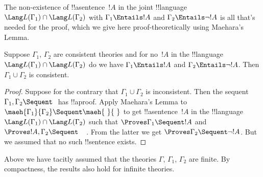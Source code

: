 \documentclass[../../../include/open-logic-section]{subfiles}
\begin{document}
The non-existence of !!a{sentence}~$!A$ in the joint
!!{language}~$\Lang L(\Gamma_1) \cap \Lang L(\Gamma_2)$ with $\Gamma_1
\Entails !A$ and $\Gamma_2 \Entails \lnot !A$ is all that's needed for
the proof, which we give here proof-theoretically using Maehara's
Lemma.

\begin{thm}
Suppose $\Gamma_1$, $\Gamma_2$ are consistent theories and for no~$!A$
in the !!{language} $\Lang L(\Gamma_1) \cap \Lang L(\Gamma_2)$ do we
have $\Gamma_1 \Entails !A$ and $\Gamma_2 \Entails \lnot !A$. Then
$\Gamma_1 \cup \Gamma_2$ is consistent.
\end{thm}

\begin{proof}
  Suppose for the contrary that $\Gamma_1 \cup \Gamma_2$ is
  inconsistent. Then the sequent $\Gamma_1, \Gamma_2 \Sequent \ $ has
  !!a{proof}. Apply Maehara's Lemma to $\maeh{\Gamma_1}{\Gamma_2}
  \Sequent \maeh{\ }{\ }$ to get !!a{sentence}~$!A$ in the
  !!{language}~$\Lang L(\Gamma_1) \cap \Lang L(\Gamma_2)$ such that
  $\Proves \Gamma_1 \Sequent !A$ and $\Proves !A, \Gamma_2 \Sequent
  \quad$. From the latter we get $\Proves \Gamma_2 \Sequent \lnot !A$.
  But we assumed that no such !!{sentence} exists.
\end{proof}

Above we have tacitly assumed that the theories $\Gamma$, $\Gamma_1$,
$\Gamma_2$ are finite. By compactness, the results also hold for
infinite theories.
\end{document}
